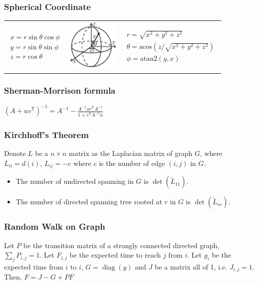 \subsubsection{Spherical Coordinate}

\begin{tabular}{ccc}
{$\begin{aligned}
  x = r\sin\theta\cos\phi \\
  y = r\sin\theta\sin\phi \\
  z = r\cos\theta
\end{aligned}$}
&
\includegraphics[width=25mm]{../codes/Misc/sphericalCoordinates.pdf}
&
{$\begin{aligned}
  r = \sqrt{x^2+y^2+z^2} \\
  \theta = \textrm{acos}(z/\sqrt{x^2+y^2+z^2}) \\
  \phi = \textrm{atan2}(y,x)
\end{aligned}$}
\end{tabular}

\subsubsection{Sherman-Morrison formula}
$\left(A + uv^\textsf{T}\right)^{-1} = A^{-1} - \frac{A^{-1}uv^\textsf{T}A^{-1}}{1 + v^\textsf{T}A^{-1}u}$

\subsubsection{Kirchhoff's Theorem}
Denote $L$ be a $n \times n$ matrix as the Laplacian matrix of graph $G$, where $L_{ii} = d(i)$, $L_{ij} = -c$ where $c$ is the number of edge $(i, j)$ in $G$.
\begin{itemize}[nosep]
    \item The number of undirected spanning in $G$ is $\det(\tilde{L}_{11})$.
    \item The number of directed spanning tree rooted at $r$ in $G$ is $\det(\tilde{L}_{rr})$.
\end{itemize}

\subsubsection{Random Walk on Graph}
Let $P$ be the transition matrix of a strongly connected directed graph, $\sum _ j P_{i,j} = 1$.
Let $F_{i,j}$ be the expected time to reach $j$ from $i$.
Let $g_i$ be the expected time from $i$ to $i$, $G = \operatorname{diag}(g)$
and $J$ be a matrix all of 1, i.e. $J_{i,j} = 1$.
Then, $F = J - G + PF$

